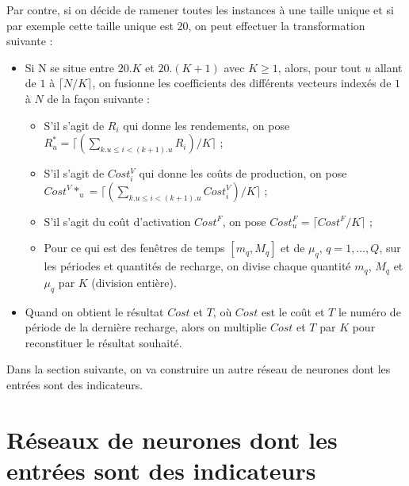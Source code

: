 Par contre, si on décide de ramener toutes les instances à une taille unique et si par exemple cette taille unique est 20, on peut effectuer la transformation suivante :

\begin{itemize}[label=$\square$]
	\item Si N se situe entre $20.K$ et $20.(K+1)$ avec $K \geq 1$, alors, pour tout $u$ allant de $1$ à $\lceil N/K\rceil$, on fusionne les coefficients des différents vecteurs indexés de $1$ à $N$ de la façon suivante :
	\begin{itemize}
		\item S'il s'agit de $R_i$ qui donne les rendements, on pose $R^*_u = \lceil(\sum_{k.u \leq i < (k+1).u} R_i)/K\rceil$ ;
		\item S'il s'agit de $Cost^V_i$ qui donne les coûts de production, on pose $Cost^V*_u =\lceil (\sum_{k.u \leq i < (k+1).u} Cost^V_i)/K\rceil$ ;
		\item S'il s'agit du coût d'activation $Cost^F$, on pose $Cost^F_u=\lceil Cost^F/K\rceil$  ;
		\item Pour ce qui est des fenêtres de temps $[m_q, M_q]$ et de $\mu_q$, $q = 1, \dots, Q$, sur les périodes et quantités de recharge, on divise chaque quantité $m_q$, $M_q$ et $\mu_q$ par $K$ (division entière).
	\end{itemize}
	\item Quand on obtient le résultat $Cost$ et $T$, où $Cost$ est le coût et $T$ le numéro de période de la dernière recharge, alors on multiplie $Cost$ et $T$ par $K$ pour reconstituer le résultat souhaité.
\end{itemize}

Dans la section suivante, on va construire un autre réseau de neurones dont les entrées sont des indicateurs.
\section{Réseaux de neurones dont les entrées sont des indicateurs}
\label{RN_PM}

